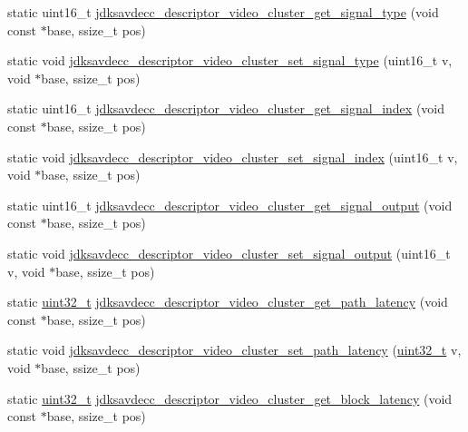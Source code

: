 \begin{DoxyCompactItemize}
static uint16\+\_\+t \hyperlink{group__descriptor__video__cluster_ga705aaaadcdcffb15854b9b0cffbcd10c}{jdksavdecc\+\_\+descriptor\+\_\+video\+\_\+cluster\+\_\+get\+\_\+signal\+\_\+type} (void const $\ast$base, ssize\+\_\+t pos)
\item 
static void \hyperlink{group__descriptor__video__cluster_ga38c932f394384b621cf1ba26782afaf8}{jdksavdecc\+\_\+descriptor\+\_\+video\+\_\+cluster\+\_\+set\+\_\+signal\+\_\+type} (uint16\+\_\+t v, void $\ast$base, ssize\+\_\+t pos)
\item 
static uint16\+\_\+t \hyperlink{group__descriptor__video__cluster_gad55e9a8c1ebd663db279f9dfea142dcc}{jdksavdecc\+\_\+descriptor\+\_\+video\+\_\+cluster\+\_\+get\+\_\+signal\+\_\+index} (void const $\ast$base, ssize\+\_\+t pos)
\item 
static void \hyperlink{group__descriptor__video__cluster_gaf9788ed501b587bd8eafafc5f0ee4aef}{jdksavdecc\+\_\+descriptor\+\_\+video\+\_\+cluster\+\_\+set\+\_\+signal\+\_\+index} (uint16\+\_\+t v, void $\ast$base, ssize\+\_\+t pos)
\item 
static uint16\+\_\+t \hyperlink{group__descriptor__video__cluster_ga4cf550fcca0e4b4ff9734ad65703c60d}{jdksavdecc\+\_\+descriptor\+\_\+video\+\_\+cluster\+\_\+get\+\_\+signal\+\_\+output} (void const $\ast$base, ssize\+\_\+t pos)
\item 
static void \hyperlink{group__descriptor__video__cluster_ga13e1589dbef4200d5797925a07cbd512}{jdksavdecc\+\_\+descriptor\+\_\+video\+\_\+cluster\+\_\+set\+\_\+signal\+\_\+output} (uint16\+\_\+t v, void $\ast$base, ssize\+\_\+t pos)
\item 
static \hyperlink{parse_8c_a6eb1e68cc391dd753bc8ce896dbb8315}{uint32\+\_\+t} \hyperlink{group__descriptor__video__cluster_ga3dc3639500193a58df094826527e0307}{jdksavdecc\+\_\+descriptor\+\_\+video\+\_\+cluster\+\_\+get\+\_\+path\+\_\+latency} (void const $\ast$base, ssize\+\_\+t pos)
\item 
static void \hyperlink{group__descriptor__video__cluster_ga7c718a1bd2c4b0a9577dafc5c11cb573}{jdksavdecc\+\_\+descriptor\+\_\+video\+\_\+cluster\+\_\+set\+\_\+path\+\_\+latency} (\hyperlink{parse_8c_a6eb1e68cc391dd753bc8ce896dbb8315}{uint32\+\_\+t} v, void $\ast$base, ssize\+\_\+t pos)
\item 
static \hyperlink{parse_8c_a6eb1e68cc391dd753bc8ce896dbb8315}{uint32\+\_\+t} \hyperlink{group__descriptor__video__cluster_ga6dc5ad183a8c8e0d52c7f656bfdef4a3}{jdksavdecc\+\_\+descriptor\+\_\+video\+\_\+cluster\+\_\+get\+\_\+block\+\_\+latency} (void const $\ast$base, ssize\+\_\+t pos)

\end{DoxyCompactItemize}
